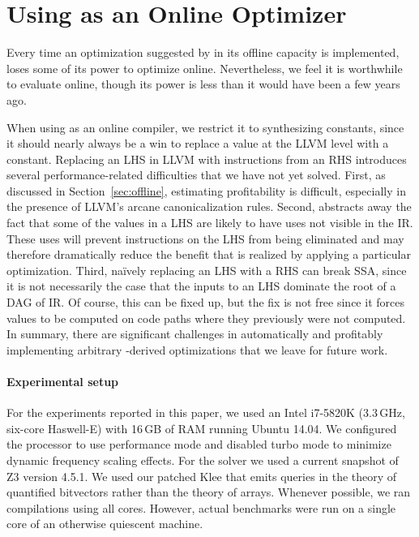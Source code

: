 \section{Using \tool{} as an Online Optimizer}
\label{sec:online}

Every time an optimization suggested by \tool{} in its offline
capacity is implemented, \tool{} loses some of its power to optimize
online.
%
Nevertheless, we feel it is worthwhile to evaluate \tool{} online,
though its power is less than it would have been a few years ago.


When using \tool{} as an online compiler, we restrict it to
synthesizing constants, since it should nearly always be a win to
replace a value at the LLVM level with a constant.
%
Replacing an LHS in LLVM with instructions from an \tool{} RHS
introduces several performance-related difficulties that we have not
yet solved.
%
First, as discussed in Section~\ref{sec:offline}, estimating
profitability is difficult, especially in the presence of LLVM's
arcane canonicalization rules.
%
Second, \tool{} abstracts away the fact that some of the values in a
LHS are likely to have uses not visible in the \tool{} IR\@.
%
These uses will prevent instructions on the LHS from being eliminated
and may therefore dramatically reduce the benefit that is realized by
applying a particular optimization.
%
Third, naïvely replacing an LHS with a RHS can break SSA, since it is
not necessarily the case that the inputs to an LHS dominate the root of
a DAG of \tool{} IR\@.
%
Of course, this can be fixed up, but the fix is not free since it
forces values to be computed on code paths where they previously were
not computed.
%
In summary, there are significant challenges in automatically and
profitably implementing arbitrary \tool-derived optimizations that we
leave for future work.


\paragraph{Experimental setup}

For the experiments reported in this paper, we used an Intel i7-5820K
(3.3\,GHz, six-core Haswell-E) with 16\,GB of RAM running Ubuntu
14.04.
%
We configured the processor to use performance mode and disabled turbo
mode to minimize dynamic frequency scaling effects.
%
For the solver we used a current snapshot of Z3 version 4.5.1.
%
We used our patched Klee that emits queries in the theory of
quantified bitvectors rather than the theory of arrays.
%
Whenever possible, we ran compilations using all cores.
%
However, actual benchmarks were run on a single core of an otherwise
quiescent machine.


